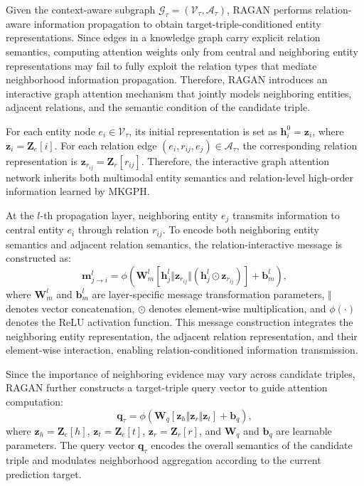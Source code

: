 \documentclass[pdflatex,sn-mathphys-num]{sn-jnl}
\begin{document}
Given the context-aware subgraph $\mathcal{G}_{\tau}=(\mathcal{V}_{\tau},\mathcal{A}_{\tau})$, RAGAN performs relation-aware information propagation to obtain target-triple-conditioned entity representations. Since edges in a knowledge graph carry explicit relation semantics, computing attention weights only from central and neighboring entity representations may fail to fully exploit the relation types that mediate neighborhood information propagation. Therefore, RAGAN introduces an interactive graph attention mechanism that jointly models neighboring entities, adjacent relations, and the semantic condition of the candidate triple.

For each entity node $e_i\in\mathcal{V}_{\tau}$, its initial representation is set as $\mathbf{h}_{i}^{0}=\mathbf{z}_{i}$, where $\mathbf{z}_{i}=\mathbf{Z}_{e}[i]$. For each relation edge $(e_i,r_{ij},e_j)\in\mathcal{A}_{\tau}$, the corresponding relation representation is $\mathbf{z}_{r_{ij}}=\mathbf{Z}_{r}[r_{ij}]$. Therefore, the interactive graph attention network inherits both multimodal entity semantics and relation-level high-order information learned by MKGPH.

At the $l$-th propagation layer, neighboring entity $e_j$ transmits information to central entity $e_i$ through relation $r_{ij}$. To encode both neighboring entity semantics and adjacent relation semantics, the relation-interactive message is constructed as:
\begin{equation}
\mathbf{m}_{j\rightarrow i}^{l}
=
\phi
\left(
\mathbf{W}_{m}^{l}
\left[
\mathbf{h}_{j}^{l}
\Vert
\mathbf{z}_{r_{ij}}
\Vert
\left(
\mathbf{h}_{j}^{l}
\odot
\mathbf{z}_{r_{ij}}
\right)
\right]
+
\mathbf{b}_{m}^{l}
\right),
\end{equation}
where $\mathbf{W}_{m}^{l}$ and $\mathbf{b}_{m}^{l}$ are layer-specific message transformation parameters, $\Vert$ denotes vector concatenation, $\odot$ denotes element-wise multiplication, and $\phi(\cdot)$ denotes the ReLU activation function. This message construction integrates the neighboring entity representation, the adjacent relation representation, and their element-wise interaction, enabling relation-conditioned information transmission.

Since the importance of neighboring evidence may vary across candidate triples, RAGAN further constructs a target-triple query vector to guide attention computation:
\begin{equation}
\mathbf{q}_{\tau}
=
\phi
\left(
\mathbf{W}_{q}
\left[
\mathbf{z}_{h}
\Vert
\mathbf{z}_{r}
\Vert
\mathbf{z}_{t}
\right]
+
\mathbf{b}_{q}
\right),
\end{equation}
where $\mathbf{z}_{h}=\mathbf{Z}_{e}[h]$, $\mathbf{z}_{t}=\mathbf{Z}_{e}[t]$, $\mathbf{z}_{r}=\mathbf{Z}_{r}[r]$, and $\mathbf{W}_{q}$ and $\mathbf{b}_{q}$ are learnable parameters. The query vector $\mathbf{q}_{\tau}$ encodes the overall semantics of the candidate triple and modulates neighborhood aggregation according to the current prediction target.
\end{document}
